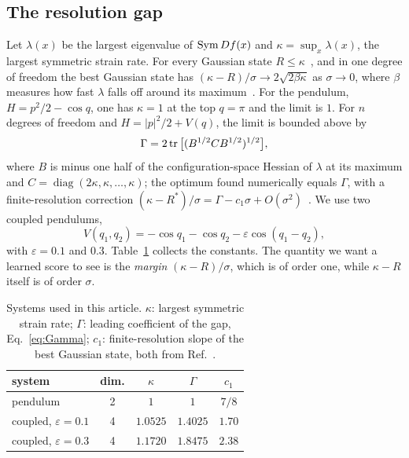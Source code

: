\subsection{The resolution gap}

Let $\lambda(x)$ be the largest eigenvalue of $\operatorname{Sym} Df(x)$ and $\kappa = \sup_x \lambda(x)$, the largest symmetric strain rate. For every Gaussian state $R \leq \kappa$~\cite{namba2026gap}, and in one degree of freedom the best Gaussian state has $(\kappa - R)/\sigma \to 2\sqrt{2\beta\kappa}$ as $\sigma\to 0$, where $\beta$ measures how fast $\lambda$ falls off around its maximum~\cite{namba2026gap}. For the pendulum, $H = p^2/2 - \cos q$, one has $\kappa = 1$ at the top $q = \pi$ and the limit is $1$. For $n$ degrees of freedom and $H = |p|^2/2 + V(q)$, the limit is bounded above by
\begin{equation}
\Gamma = 2\operatorname{tr}\big[(B^{1/2} C B^{1/2})^{1/2}\big],
\label{eq:Gamma}
\end{equation}
where $B$ is minus one half of the configuration-space Hessian of $\lambda$ at its maximum and $C = \operatorname{diag}(2\kappa, \kappa, \dots, \kappa)$; the optimum found numerically equals $\Gamma$, with a finite-resolution correction $(\kappa - R^*)/\sigma = \Gamma - c_1\sigma + O(\sigma^2)$~\cite{namba2026many}. We use two coupled pendulums,
\begin{equation}
V(q_1, q_2) = -\cos q_1 - \cos q_2 - \varepsilon \cos(q_1 - q_2),
\label{eq:coupled}
\end{equation}
with $\varepsilon = 0.1$ and $0.3$. Table~\ref{tab:systems} collects the constants. The quantity we want a learned score to see is the \emph{margin} $(\kappa - R)/\sigma$, which is of order one, while $\kappa - R$ itself is of order $\sigma$.

\begin{table}[t]
\caption{Systems used in this article. $\kappa$: largest symmetric strain rate; $\Gamma$: leading coefficient of the gap, Eq.~\eqref{eq:Gamma}; $c_1$: finite-resolution slope of the best Gaussian state, both from Ref.~\cite{namba2026many}.}
\label{tab:systems}
\begin{ruledtabular}
\begin{tabular}{lcccc}
system & dim. & $\kappa$ & $\Gamma$ & $c_1$ \\
\hline
pendulum & 2 & $1$ & $1$ & $7/8$ \\
coupled, $\varepsilon\!=\!0.1$ & 4 & $1.0525$ & $1.4025$ & $1.70$ \\
coupled, $\varepsilon\!=\!0.3$ & 4 & $1.1720$ & $1.8475$ & $2.38$ \\
\end{tabular}
\end{ruledtabular}
\end{table}

